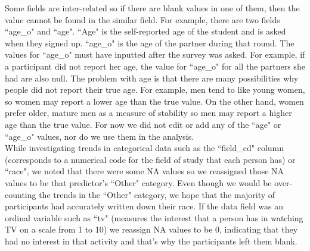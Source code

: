 \documentclass{article}
\begin{document}

Some fields are inter-related so if there are blank values in one of them, then the value cannot be found in the similar field. For example, there are two fields ``age\_o" and ``age". ``Age" is the self-reported age of the student and is asked when they signed up. ``age\_o" is the age of the partner during that round.  The values for ``age\_o" must have inputted after the survey was asked.  For example, if a participant did not report her age, the value for ``age\_o" for all the partners she had are also null.  The problem with age is that there are many possibilities why people did not report their true age.  For example, men tend to like young women, so women may report a lower age than the true value.  On the other hand, women prefer older, mature men as a measure of stability so men may report a higher age than the true value.  For now we did not edit or add any of the ``age" or ``age\_o" values, nor do we use them in the analysis.\\

While investigating trends in categorical data such as the ``field\_cd" column (corresponds to a numerical code for the field of study that each person has) or ``race", we noted that there were some NA values so we reassigned those NA values to be that predictor's ``Other" category.  Even though we would be over-counting the trends in the ``Other" category, we hope that the majority of participants had accurately written down their race.  If the data field was an ordinal variable such as ``tv" (measures the interest that a person has in watching TV on a scale from 1 to 10) we reassign NA values to be 0, indicating that they had no interest in that activity and that's why the participants left them blank.\\
\end{document}
